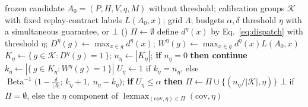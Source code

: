 \begin{algorithm}[t]
\caption{\textsc{Calibrate} --- fixed-grid exact selective admission. The score $q$ and
the grid $\Lambda$ are frozen \emph{before} this procedure sees a calibration group,
which is what makes the union bound legitimate.}
\label{alg:calibrate}
\scriptsize
\begin{algorithmic}[1]
\Require frozen candidate $A_0=(P,H,V,q,M)$ without threshold; calibration
         groups $\mathcal{K}$ with fixed replay-contract labels $L(A_0,x)$;
         grid $\Lambda$; budgets $\alpha,\delta$
\Ensure threshold $\eta$ with a simultaneous guarantee, or $\bot$ (\retire)
\State $\Pi\gets\emptyset$ 
\ForAll{$\eta\in\Lambda$}
  \State define $d^\eta(x)$ by Eq.~\eqref{eq:dispatch} with threshold $\eta$;
         $D^\eta(g)\gets\max_{x\in g}d^\eta(x)$;
         $W^\eta(g)\gets\max_{x\in g}d^\eta(x)L(A_0,x)$
  \State $K_\eta\gets\{\,g\in\mathcal{K}:D^\eta(g)=1\,\}$;\quad
         $n_\eta\gets|K_\eta|$;\quad
         \textbf{if} $n_\eta=0$ \textbf{then continue}
  \State $k_\eta\gets|\{\,g\in K_\eta:W^\eta(g)=1\,\}|$
  \State $U_\eta\gets 1$ if $k_\eta=n_\eta$, else
         $\operatorname{Beta}^{-1}\!\big(1-\tfrac{\delta}{|\Lambda|};\,
         k_\eta+1,\ n_\eta-k_\eta\big)$;\quad
         \textbf{if} $U_\eta\le\alpha$ \textbf{then}
         $\Pi\gets\Pi\cup\{(n_\eta/|\mathcal{K}|,\eta)\}$
\EndFor
\State \Return $\bot$ if $\Pi=\emptyset$, else the $\eta$ component of
       $\operatorname*{lexmax}_{(\mathrm{cov},\eta)\in\Pi}
       (\mathrm{cov},\eta)$
\end{algorithmic}
\end{algorithm}
